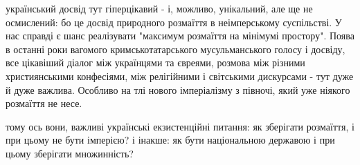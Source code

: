 український досвід тут гіперцікавий - і, можливо, унікальний, але ще не
осмислений: бо це досвід природного розмаїття в неімперському суспільстві. У
нас справді є шанс реалізувати "максимум розмаїття на мінімумі простору". Поява
в останні роки вагомого кримськотатарського мусульманського голосу і досвіду,
все цікавіший діалог між українцями та євреями, розмова між різними
християнськими конфесіями, між релігійними і світськими дискурсами - тут дуже й
дуже важлива. Особливо на тлі нового імперіалізму з півночі, який уже ніякого
розмаїття не несе.  

тому ось вони, важливі українські екзистенційні питання: як зберігати
розмаїття, і при цьому не бути імперією? і інакше: як бути національною
державою і при цьому зберігати множинність?

